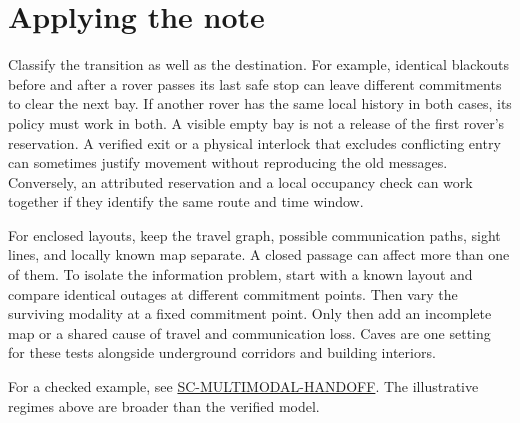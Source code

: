 \documentclass[11pt]{article}
\begin{document}
\section{Applying the note}
Classify the transition as well as the destination. For example, identical blackouts before and after a rover passes its last safe stop can leave different commitments to clear the next bay. If another rover has the same local history in both cases, its policy must work in both. A visible empty bay is not a release of the first rover's reservation. A verified exit or a physical interlock that excludes conflicting entry can sometimes justify movement without reproducing the old messages. Conversely, an attributed reservation and a local occupancy check can work together if they identify the same route and time window.

For enclosed layouts, keep the travel graph, possible communication paths, sight lines, and locally known map separate. A closed passage can affect more than one of them. To isolate the information problem, start with a known layout and compare identical outages at different commitment points. Then vary the surviving modality at a fixed commitment point. Only then add an incomplete map or a shared cause of travel and communication loss. Caves are one setting for these tests alongside underground corridors and building interiors.

For a checked example, see \href{https://github.com/eternal-november/eos-research-programmes/tree/main/projects/swarm-coordination/research/communication/multimodal-bay}{SC-MULTIMODAL-HANDOFF}. The illustrative regimes above are broader than the verified model.
\end{document}
